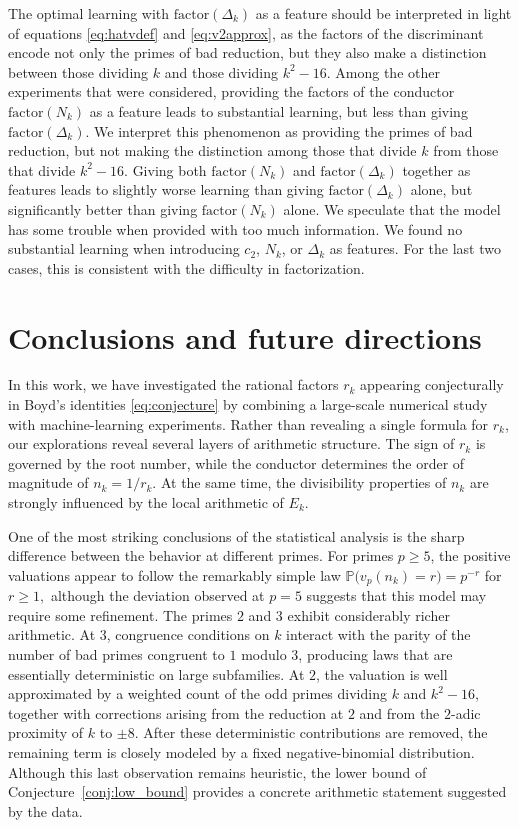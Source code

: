 \documentclass[12pt]{amsart}%
\newcommand{\1}{\mathds{1}}
\theoremstyle{definition}
\numberwithin{equation}{section}
\numberwithin{table}{section}
\numberwithin{figure}{section}
\begin{document}
 The optimal learning with   $\text{factor}(\Delta_k)$ as a feature should be interpreted in light of equations  \eqref{eq:hatvdef} and \eqref{eq:v2approx}, as the factors of the discriminant encode not only the primes of bad reduction, but they also make a distinction between those dividing $k$ and those dividing $k^2-16$.
Among the other experiments that were considered, providing the  factors of the conductor
$\text{factor}(N_k)$ as a feature leads to substantial learning, but less than giving $\text{factor}(\Delta_k)$. We interpret this phenomenon as providing the primes of bad reduction, but not making the distinction among those that divide $k$ from those that divide $k^2-16$.  Giving both
$\text{factor}(N_k)$ and $\text{factor}(\Delta_k)$ together as features leads to slightly worse learning than giving
$\text{factor}(\Delta_k)$ alone, but significantly better than giving $\text{factor}(N_k)$ alone. We speculate that the model has some trouble when provided with too much information. We found no substantial learning when introducing $c_2$, $N_k$, or $\Delta_k$ as features. For the last two cases, this is consistent with the difficulty in factorization.


\section{Conclusions and future directions}
\label{sec:conclusions}

In this work, we have investigated the rational factors $r_k$ appearing
conjecturally in Boyd's identities \eqref{eq:conjecture}
by combining a large-scale numerical study with machine-learning experiments.
Rather than revealing a single formula for $r_k$, our explorations reveal
several layers of arithmetic structure. The sign of $r_k$ is governed by the
root number, while the conductor determines the order of magnitude of
$n_k=1/r_k$.
At the same time, the divisibility properties of $n_k$ are strongly influenced
by the local arithmetic of $E_k$.

One of the most striking conclusions of the statistical analysis is the sharp
difference between the behavior at different primes. For primes $p\geq 5$, the
positive valuations appear to follow the remarkably simple law $\mathbb{P}\bigl(v_p(n_k)=r\bigr)=p^{-r}$ for $r\geq 1,$
although the deviation observed at $p=5$ suggests that this model may require
some refinement. The primes $2$ and $3$ exhibit considerably richer
arithmetic. At $3$, congruence conditions on $k$ interact with the parity of
the number of bad primes congruent to $1$ modulo $3$, producing laws that are
essentially deterministic on large subfamilies. At $2$, the valuation is well
approximated by a weighted count of the odd primes dividing $k$ and
$k^2-16$, together with corrections arising from the reduction at $2$ and
from the $2$-adic proximity of $k$ to $\pm8$. After these deterministic contributions are removed, the remaining term is
closely modeled by a fixed negative-binomial distribution. Although this last
observation remains heuristic, the lower bound of Conjecture~\ref{conj:low_bound}
provides a concrete arithmetic statement suggested by the data.
\end{document}
